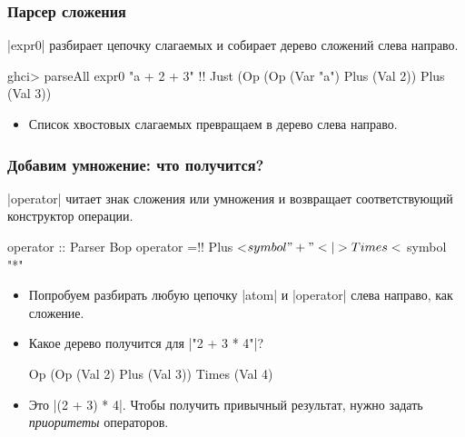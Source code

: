 \documentclass[11pt]{beamer}
\begin{document}
\begin{frame}[fragile]
  \frametitle{Парсер сложения}
  \haskinline|expr0| разбирает цепочку слагаемых и собирает дерево сложений слева направо.
  \pause
  \begin{haskellsmall}
    ghci> parseAll expr0 "a + 2 + 3" !\pause!
    Just (Op (Op (Var "a") Plus (Val 2))
             Plus (Val 3))
  \end{haskellsmall}
  \begin{itemize}
    \item Список хвостовых слагаемых превращаем в дерево слева направо.
  \end{itemize}
\end{frame}

\begin{frame}[fragile]
  \frametitle{Добавим умножение: что получится?}
  \haskinline|operator| читает знак сложения или умножения и возвращает соответствующий конструктор операции.
  \pause
  \begin{haskellsmall}
    operator :: Parser Bop
    operator =!\pause! Plus  <$ symbol "+"
           <|> Times <$ symbol "*"
  \end{haskellsmall}
  \begin{itemize}
    \item Попробуем разбирать любую цепочку \haskinline|atom| и \haskinline|operator| слева направо, как сложение.
    \item Какое дерево получится для \haskinline|"2 + 3 * 4"|?
      \pause
      \begin{haskellsmall}
        Op (Op (Val 2) Plus (Val 3)) Times (Val 4)
      \end{haskellsmall}
    \item Это \haskinline|(2 + 3) * 4|. Чтобы получить привычный результат, нужно задать \emph{приоритеты} операторов.
  \end{itemize}
\end{frame}
\end{document}
